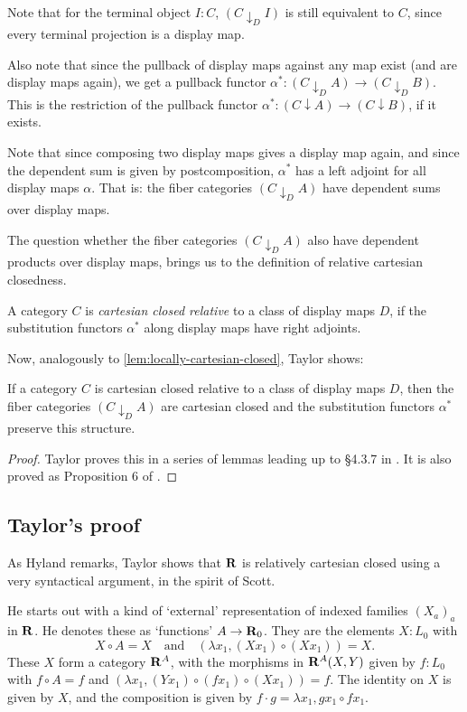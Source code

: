 Note that for the terminal object $ I : C $, $ (C \downarrow_D I) $ is still equivalent to $ C $, since every terminal projection is a display map.

Also note that since the pullback of display maps against any map exist (and are display maps again), we get a pullback functor $ \alpha^*: (C \downarrow_D A) \to (C \downarrow_D B) $. This is the restriction of the pullback functor $ \alpha^*: (C \downarrow A) \to (C \downarrow B) $, if it exists.

Note that since composing two display maps gives a display map again, and since the dependent sum is given by postcomposition, $ \alpha^* $ has a left adjoint for all display maps $ \alpha $. That is: the fiber categories $ (C \downarrow_D A) $ have dependent sums over display maps.

The question whether the fiber categories $ (C \downarrow_D A) $ also have dependent products over display maps, brings us to the definition of relative cartesian closedness.
\begin{definition}
  A category $ C $ is \textit{cartesian closed relative} to a class of display maps $ D $, if the substitution functors $ \alpha^* $ along display maps have right adjoints.
\end{definition}

Now, analogously to \ref{lem:locally-cartesian-closed}, Taylor shows:
\begin{lemma}
  If a category $ C $ is cartesian closed relative to a class of display maps $ D $, then the fiber categories $ (C \downarrow_D A) $ are cartesian closed and the substitution functors $ \alpha^* $ preserve this structure.
\end{lemma}
\begin{proof}
  Taylor proves this in a series of lemmas leading up to \S 4.3.7 in \cite{taylor}. It is also proved as Proposition 6 of \cite{theory-of-constructions}.
\end{proof}

\subsection{Taylor's proof}

As Hyland remarks, Taylor shows that $ \mathbf{R} $ is relatively cartesian closed using a very syntactical argument, in the spirit of Scott.

He starts out with a kind of `external' representation of indexed families $ (X_a)_a $ in $ \mathbf{R} $. He denotes these as `functions' $ A \to \mathbf{R}_0 $. They are the elements $ X: L_0 $ with
\[ X \circ A = X \quad \text{and} \quad (\lambda x_1, (X x_1) \circ (X x_1)) = X. \]
These $ X $ form a category $ \mathbf{R}^A $, with the morphisms in $ \mathbf{R}^A(X, Y) $ given by $ f: L_0 $ with $ f \circ A = f $ and $ (\lambda x_1, (Y x_1) \circ (f x_1) \circ (X x_1)) = f $. The identity on $ X $ is given by $ X $, and the composition is given by $ f \cdot g = \lambda x_1, g x_1 \circ f x_1 $.


